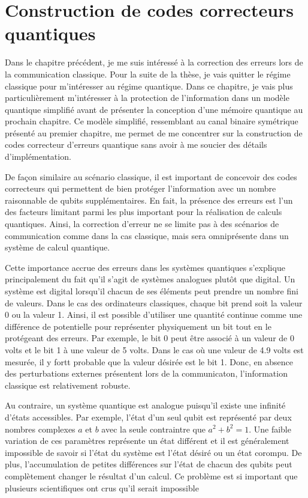 \begin{comment}
\end{comment}

\chapter{Construction de codes correcteurs quantiques}

Dans le chapitre précédent, 
je me suis intéressé à la correction des erreurs lors de la communication classique.
Pour la suite de la thèse,
je vais quitter le régime classique pour m'intéresser au régime quantique.
Dans ce chapitre, 
je vais plus particulièrement m'intéresser à la protection de l'information 
dans un modèle quantique simplifié avant de présenter la conception d'une mémoire 
quantique au prochain chapitre.
Ce modèle simplifié, 
ressemblant au canal binaire symétrique présenté au premier chapitre, 
me permet de me concentrer sur la construction de codes correcteur d'erreurs quantique
sans avoir à me soucier des détails d'implémentation.

De façon similaire au scénario classique,
il est important de concevoir des codes correcteurs qui permettent 
de bien protéger l'information avec un nombre raisonnable de qubits supplémentaires.
En fait,
la présence des erreurs est l'un des facteurs limitant parmi les plus
important pour la réalisation de calculs quantiques.
Ainsi, 
la correction d'erreur ne se limite pas à des scénarios de communication 
comme dans la cas classique,
mais sera omniprésente dans un système de calcul quantique.

Cette importance accrue des erreurs dans les systèmes quantiques s'explique
principalement du fait qu'il s'agit de systèmes analogues plutôt que digital.
Un système est digital lorsqu'il chacun de ses éléments peut prendre un nombre fini
de valeurs. 
Dans le cas des ordinateurs classiques,
chaque bit prend soit la valeur 0 ou la valeur 1.
Ainsi,
il est possible d'utiliser une quantité continue comme une différence de potentielle 
pour représenter physiquement un bit tout en le protégeant des erreurs.
Par exemple,
le bit 0 peut être associé à un valeur de 0 volts et le bit 1 à une valeur de 5 volts.
Dans le cas où une valeur de 4.9 volts est mesurée, il y fortt probable que 
la valeur désirée est le bit 1.
Donc, en absence des perturbations externes présentent lors de la communicaton,
l'information classique est relativement robuste.

Au contraire, un système quantique est analogue puisqu'il existe une infinité d'états accessibles.
Par exemple, l'état d'un seul qubit est représenté par deux nombres complexes $a$ et $b$ 
avec la seule contraintre que $a^2 + b^2 = 1$. 
Une faible variation de ces paramètres représente un état différent et il est généralement
impossible de savoir si l'état du système est l'état désiré ou un état corompu.
De plus, l'accumulation de petites différences sur l'état de chacun des qubits peut complètement
changer le résultat d'un calcul.
Ce problème est si important que plusieurs scientifiques ont crus qu'il serait impossible




